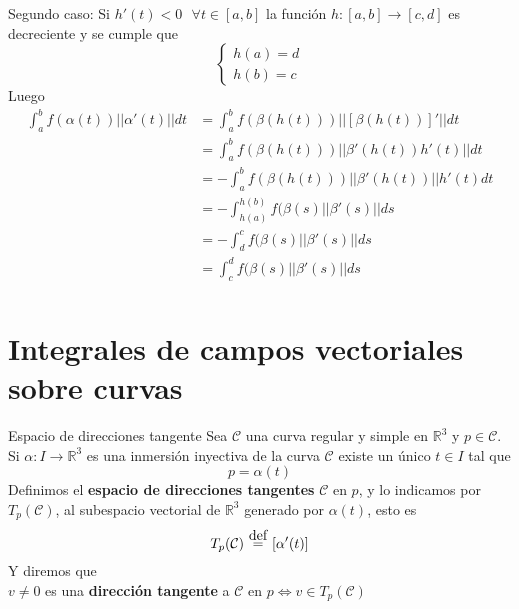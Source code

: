 \documentclass{report}
\newcommand\defeq{\stackrel{\mathclap{\normalfont\mbox{def}}}{~=~}}
\newcommand\reals{\mathds{R}}
\begin{document}
Segundo caso: Si $h'(t) < 0 ~~~ \forall t \in [a,b]$ la función $h: [a,b] \rightarrow [c,d]$ es decreciente y se cumple que
\[
	\left\{ \begin{array}{l}
		h(a) = d \\
		h(b) = c
	\end{array} \right.
\]
Luego \\
\[
	\begin{array}{ll}
		\int_a^b{f(\alpha (t)) ||\alpha '(t)||dt} & = \int_a^b{f(\beta (h(t))) ||[\beta (h(t))]'||dt}     \\
		                                          & = \int_a^b{f(\beta (h(t))) ||\beta '(h(t))h'(t)||dt}  \\
		                                          & = -\int_a^b{f(\beta (h(t))) ||\beta '(h(t))||h'(t)dt} \\
		                                          & = -\int_{h(a)}^{h(b)}{f(\beta (s) ||\beta '(s)||ds}   \\
		                                          & = -\int_{d}^{c}{f(\beta (s) ||\beta '(s)||ds}         \\
		                                          & = \int_{c}^{d}{f(\beta (s) ||\beta '(s)||ds}          \\
	\end{array}
\]

\section{Integrales de campos vectoriales sobre curvas}

\begin{defbox}{Espacio de direcciones tangente}
	Sea $\mathcal{C}$ una curva regular y simple en $\reals^3$ y $p\in \mathcal{C}$. \\
	Si $\alpha : I \rightarrow \reals^3$ es una inmersión inyectiva de la curva $\mathcal{C}$ existe un único $t\in I$ tal que
	\[
		p = \alpha (t)
	\]
	Definimos el \textbf{espacio de direcciones tangentes} $\mathcal{C}$ en $p$, y lo indicamos por $T_p(\mathcal{C})$, al subespacio vectorial de $\reals^3$ generado por $\alpha (t)$, esto es
	\[
		T_p(\mathcal{C}) \defeq [\alpha '(t)]
	\]
	Y diremos que \\
	$v \ne 0$ es una \textbf{dirección tangente} a $\mathcal{C}$ en $p \iff v \in T_p(\mathcal{C})$
\end{defbox}
\end{document}
